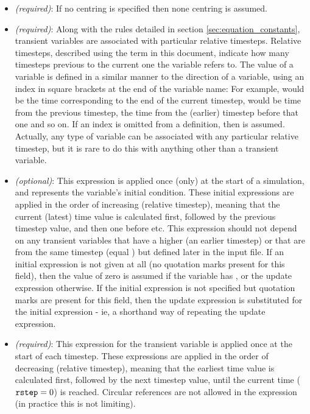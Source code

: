 \begin{itemize}
\item {} \emph{(required)}:  If no centring is specified then none centring is assumed.
%
\item {} \emph{(required)}:  Along with the rules detailed in section \ref{sec:equation_constants}, transient variables are associated with particular relative timesteps.  Relative timesteps, described using the term  in this document, indicate how many timesteps previous to the current one the variable refers to.  The  value of a variable is defined in a similar manner to the direction of a variable, using an  index in square brackets at the end of the variable name:  For example,  would be the time corresponding to the end of the current timestep,  would be time from the previous timestep,  the time from the (earlier) timestep before that one and so on.  If an  index is omitted from a definition, then  is assumed.  Actually, any type of variable can be associated with any particular relative timestep, but it is rare to do this with anything other than a transient variable.
%
\item {} \emph{(optional)}:  This expression is applied once (only) at the start of a simulation, and represents the variable's initial condition.  These initial expressions are applied in the order of increasing  (relative timestep), meaning that the current (latest) time value is calculated first, followed by the previous timestep value, and then one before etc.  This expression should not depend on any transient variables that have a higher  (an earlier timestep) or that are from the same timestep (equal ) but defined later in the input file.  If an initial expression is not given at all (no quotation marks present for this field), then the value of zero is assumed if the variable has , or the update expression otherwise.  If the initial expression is not specified but quotation marks are present for this field, then the update expression is substituted for the initial expression - ie, a shorthand way of repeating the update expression.
%
\item {} \emph{(required)}:  This expression for the transient variable is applied once at the start of each timestep.  These expressions are applied in the order of decreasing  (relative timestep), meaning that the earliest time value is calculated first, followed by the next timestep value, until the current time ($\texttt{rstep}=0$) is reached.  Circular references are not allowed in the expression (in practice this is not limiting).

\end{itemize}
